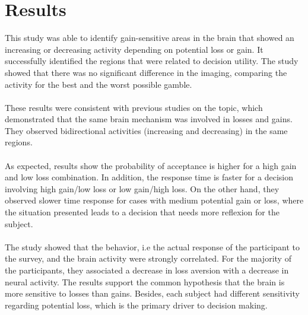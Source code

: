 \documentclass{article}
\begin{document}
\section{Results}
This study was able to identify gain-sensitive areas in the brain that showed an increasing or decreasing activity depending on potential loss or gain. It successfully identified the regions that were related to decision utility. The study showed that there was no significant difference in the imaging, comparing the activity for the best and the worst possible gamble.\\\\
These results were consistent with previous studies on the topic, which demonstrated that the same brain mechanism was involved in losses and gains. They observed bidirectional activities (increasing and decreasing) in the same regions.\\\\
As expected, results show the probability of acceptance is higher for a high gain and low loss combination. In addition, the response time is faster for a decision involving high gain/low loss or low gain/high loss. On the other hand, they observed slower time response for cases with medium potential gain or loss, where the situation presented leads to a decision that needs more reflexion for the subject.\\\\
The study showed that the behavior, i.e the actual response of the participant to the survey, and the brain activity were strongly correlated.  For the majority of the participants, they associated a decrease in loss aversion with a decrease in neural activity. The results support the common hypothesis that the brain is more sensitive to losses than gains. Besides, each subject had different sensitivity regarding potential loss, which is the primary driver to  decision making.
\end{document}
